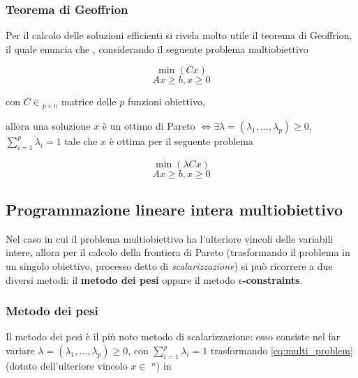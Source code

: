 \subsubsection{Teorema di Geoffrion}
\label{section:geoffrion}

Per il calcolo delle soluzioni efficienti si rivela molto utile il teorema di Geoffrion, il
quale enuncia che \cite{Figueira2006}, considerando il seguente problema multiobiettivo

\begin{equation*}
    \min (Cx)    
    \label{eq:}
\end{equation*}
\begin{equation}
    Ax \geq b, x \geq 0
    \label{eq:multi_problem}
\end{equation}

\noindent
con $C \in $\Rset$_{p \times n}$ matrice delle $p$ funzioni obiettivo,

allora una soluzione $x$ è un ottimo di Pareto $\iff \exists \lambda = (\lambda_1, \dots, 
\lambda_p) \geq 0$, $\sum_{i=1}^{p} \lambda_i = 1$ tale che $x$ è ottima per il seguente 
problema

\begin{equation*}
    \min (\lambda Cx)    
    \label{eq:}
\end{equation*}
\begin{equation*}
    Ax \geq b, x \geq 0
    \label{eq:}
\end{equation*}

\subsection{Programmazione lineare intera multiobiettivo}
\label{section:plimo}

Nel caso in cui il problema multiobiettivo ha l'ulteriore vincoli delle variabili intere,
allora per il calcolo della frontiera di Pareto (trasformando il problema in un singolo 
obiettivo, processo detto di \textit{scalarizzazione}) si può ricorrere a due diversi metodi: 
il \textbf{metodo dei pesi} oppure il metodo \textbf{$\epsilon$-constraints}. 

\subsubsection{Metodo dei pesi}
\label{section:weight_method}

Il metodo dei pesi è il più noto metodo di scalarizzazione: esso consiste nel far variare 
$\lambda = (\lambda_1, \dots, \lambda_p) \geq 0$, con $\sum_{i=1}^{p} \lambda_i = 1$ trasformando 
\ref{eq:multi_problem} (dotato dell'ulteriore vincolo $x \in$ \Zset$^n$) in 

